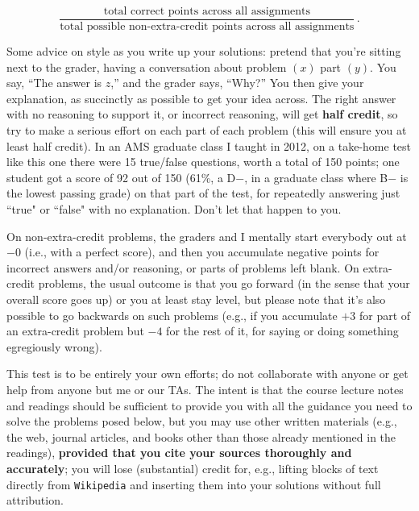 \documentclass[12pt]{article}
\renewcommand{\r}[1]{\text{#1}}
\begin{document}
\begin{equation} \label{e:course-score-1}
\frac{ \r{total correct points across all assignments} }{ \r{total possible non-extra-credit points across all assignments} } \, .
\end{equation}

Some advice on style as you write up your solutions: pretend that you're sitting next to the grader, having a conversation about problem $( x )$ part $( y )$. You say, ``The answer is $z$,'' and the grader says, ``Why?'' You then give your explanation, as succinctly as possible to get your idea across. The right answer with no reasoning to support it, or incorrect reasoning, will get \textbf{half credit}, so try to make a serious effort on each part of each problem (this will ensure you at least half credit). In an AMS graduate class I taught in 2012, on a take-home test like this one there were 15 true/false questions, worth a total of 150 points; one student got a score of 92 out of 150 (61\%, a D$-$, in a graduate class where B$-$ is the lowest passing grade) on that part of the test, for repeatedly answering just ``true" or ``false" with no explanation. Don't let that happen to you.  

On non-extra-credit problems, the graders and I mentally start everybody out at $-0$ (i.e., with a perfect score), and then you accumulate negative points for
incorrect answers and/or reasoning, or parts of problems left blank. On
extra-credit problems, the usual outcome is that you go forward (in the
sense that your overall score goes up) or you at least stay level, but
please note that it's also possible to go backwards on such problems (e.g.,
if you accumulate $+3$ for part of an extra-credit problem but $-4$ for the
rest of it, for saying or doing something egregiously wrong).

This test is to be entirely your own efforts; do not collaborate with
anyone or get help from anyone but me or our TAs. The intent is that the course lecture notes and readings should be sufficient to provide you with all the guidance you need to solve the problems posed below, but you may use other written materials (e.g., the web, journal articles, and books other than those already mentioned in the readings),
\textbf{provided that you cite your sources thoroughly and accurately}; you
will lose (substantial) credit for, e.g., lifting blocks of text directly
from \texttt{Wikipedia} and inserting them into your solutions without full
attribution.
\end{document}
